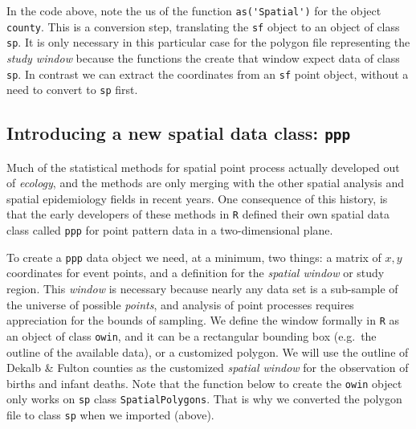 \documentclass[
]{book}
\newcommand{\passthrough}[1]{#1}
\begin{document}
In the code above, note the us of the function \passthrough{\lstinline!as('Spatial')!} for the object \passthrough{\lstinline!county!}. This is a conversion step, translating the \passthrough{\lstinline!sf!} object to an object of class \passthrough{\lstinline!sp!}. It is only necessary in this particular case for the polygon file representing the \emph{study window} because the functions the create that window expect data of class \passthrough{\lstinline!sp!}. In contrast we can extract the coordinates from an \passthrough{\lstinline!sf!} point object, without a need to convert to \passthrough{\lstinline!sp!} first.

\hypertarget{introducing-a-new-spatial-data-class-ppp}{%
\subsection{\texorpdfstring{Introducing a new spatial data class: \texttt{ppp}}{Introducing a new spatial data class: ppp}}\label{introducing-a-new-spatial-data-class-ppp}}

Much of the statistical methods for spatial point process actually developed out of \emph{ecology}, and the methods are only merging with the other spatial analysis and spatial epidemiology fields in recent years. One consequence of this history, is that the early developers of these methods in \passthrough{\lstinline!R!} defined their own spatial data class called \passthrough{\lstinline!ppp!} for point pattern data in a two-dimensional plane.

To create a \passthrough{\lstinline!ppp!} data object we need, at a minimum, two things: a matrix of \(x,y\) coordinates for event points, and a definition for the \emph{spatial window} or study region. This \emph{window} is necessary because nearly any data set is a sub-sample of the universe of possible \emph{points}, and analysis of point processes requires appreciation for the bounds of sampling. We define the window formally in \passthrough{\lstinline!R!} as an object of class \passthrough{\lstinline!owin!}, and it can be a rectangular bounding box (e.g.~the outline of the available data), or a customized polygon. We will use the outline of Dekalb \& Fulton counties as the customized \emph{spatial window} for the observation of births and infant deaths. Note that the function below to create the \passthrough{\lstinline!owin!} object only works on \passthrough{\lstinline!sp!} class \passthrough{\lstinline!SpatialPolygons!}. That is why we converted the polygon file to class \passthrough{\lstinline!sp!} when we imported (above).
\end{document}
